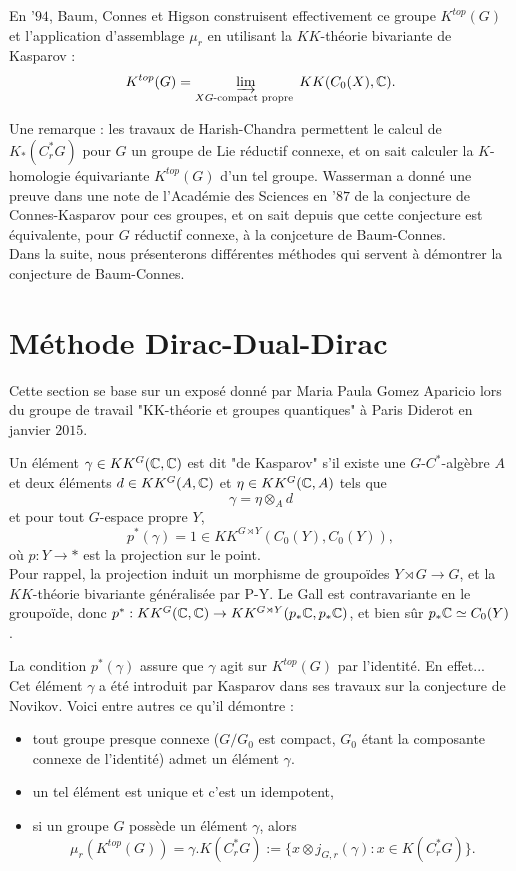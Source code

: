 En '$94$, Baum, Connes et Higson construisent effectivement ce groupe $K^{top}(G)$ et l'application d'assemblage $\mu_r$ en utilisant la $KK$-théorie bivariante de Kasparov : 
\[K^{top}(G)=\varinjlim_{X G\text{-compact propre }} KK(C_0(X), \mathbb C).\]

Une remarque : les travaux de Harish-Chandra permettent le calcul de $K_*(C^*_r G)$ pour $G$ un groupe de Lie réductif connexe, et on sait calculer la $K$-homologie équivariante $K^{top}(G)$ d'un tel groupe. Wasserman a donné une preuve dans une note de l'Académie des Sciences en '$87$ de la conjecture de Connes-Kasparov pour ces groupes, et on sait depuis que cette conjecture est équivalente, pour $G$ réductif connexe, à la conjceture de Baum-Connes.\\

Dans la suite, nous présenterons différentes méthodes qui servent à démontrer la conjecture de Baum-Connes.\\

\section{Méthode Dirac-Dual-Dirac}
Cette section se base sur un exposé donné par Maria Paula Gomez Aparicio lors du groupe de travail "KK-théorie et groupes quantiques" à Paris Diderot en janvier $2015$.\\

\begin{definition}
Un élément $\gamma \in KK^{G}(\mathbb C,\mathbb C)$ est dit "de Kasparov" s'il existe une $G$-$C^*$-algèbre $A$ et deux éléments $d\in KK^{G}(A,\mathbb C)$ et $\eta \in KK^{G}(\mathbb C,A)$ tels que
\[\gamma = \eta \otimes_A d \]
et pour tout $G$-espace propre $Y$,
\[p^*(\gamma)=1\in KK^{G\rtimes Y}(C_0(Y),C_0(Y)),\]
où $p : Y\rightarrow *$ est la projection sur le point. \\

Pour rappel, la projection induit un morphisme de groupoïdes $Y \rtimes G\rightarrow G$, et la $KK$-théorie bivariante généralisée par P-Y. Le Gall est contravariante en le groupoïde, donc $p^* : KK^G(\mathbb C,\mathbb C)\rightarrow KK^{G\rtimes Y}(p_* \mathbb C,p_* \mathbb C)$, et bien sûr $p_*\mathbb C \simeq C_0(Y)$.
\end{definition}%

La condition $p^*(\gamma)$ assure que $\gamma$ agit sur $K^{top}(G)$ par l'identité. En effet...\\

Cet élément $\gamma$ a été introduit par Kasparov dans ses travaux sur la conjecture de Novikov. Voici entre autres ce qu'il démontre :
\begin{itemize}
\item tout groupe presque connexe ($G/G_0$ est compact, $G_0$ étant la composante connexe de l'identité) admet un élément $\gamma$.
\item un tel élément est unique et c'est un idempotent,
\item si un groupe $G$ possède un élément $\gamma$, alors 
\[\mu_r(K^{top}(G)) = \gamma.K(C^*_r G) := \{x\otimes j_{G,r}(\gamma) : x\in K(C^*_r G)\}.\]
\end{itemize}

